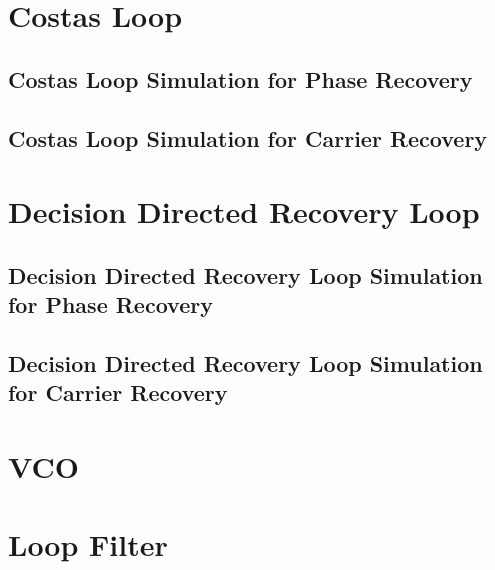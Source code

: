 \documentclass[]{article}
\begin{document}
\appendix
\newpage


\newpage
%

\section{Costas Loop}
\subsection{Costas Loop Simulation for Phase Recovery}


\subsection{Costas Loop Simulation for Carrier Recovery}


\section{Decision Directed Recovery Loop}
\subsection{Decision Directed Recovery Loop Simulation for Phase Recovery}


\subsection{Decision Directed Recovery Loop Simulation for Carrier Recovery}


\section{VCO}


\section{Loop Filter}

\end{document}

